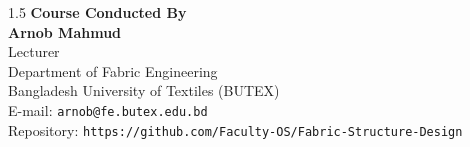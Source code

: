 \begin{spacing}{1.5}
    \textbf{Course Conducted By}\\
    \textbf{Arnob Mahmud}\\
    Lecturer\\
    Department of Fabric Engineering\\
    Bangladesh University of Textiles (BUTEX)\\
    E-mail: \texttt{arnob@fe.butex.edu.bd} \\
    Repository: \texttt{https://github.com/Faculty-OS/Fabric-Structure-Design}
\end{spacing}
